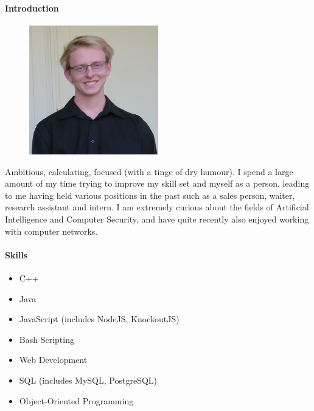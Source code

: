 \documentclass{article}
\begin{document}
        \paragraph{Introduction}
        \begin{figure}
            \begin{center}
            \vspace{-0.75cm}
            \includegraphics[width=0.5\textwidth]{img/andreas.jpg}
            \end{center}
        \end{figure}
        Ambitious, calculating, focused (with a tinge of dry humour). I spend a large amount of my time trying to improve my skill set and myself as a person, leading to me having held various positions in the past such as a sales person, waiter, research assistant and intern. I am extremely curious about the fields of Artificial Intelligence and Computer Security, and have quite recently also enjoyed working with computer networks.
        \paragraph{Skills}
            \begin{itemize}
                \item C++
                \item Java
                \item JavaScript (includes NodeJS, KnockoutJS)
                \item Bash Scripting
                \item Web Development
                \item SQL (includes MySQL, PostgreSQL)
                \item Object-Oriented Programming
            \end{itemize}
            
\end{document}
